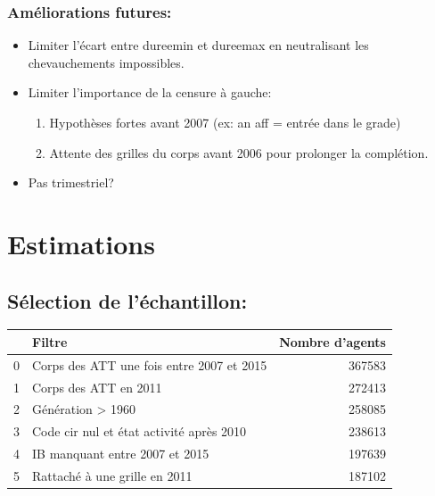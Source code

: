 \documentclass[11pt,a4paper]{article}
\begin{document}
\subsubsection*{Améliorations futures:}

\begin{itemize}[leftmargin=1cm ,parsep=0cm,itemsep=0cm,topsep=0cm] 
\item Limiter l'écart entre dureemin et dureemax en neutralisant les chevauchements impossibles. 
\item Limiter l'importance de la censure à gauche: 
\begin{enumerate}[leftmargin=1cm ,parsep=0cm,itemsep=0cm,topsep=0cm] 
\item Hypothèses fortes avant 2007 (ex: an aff = entrée dans le grade)
\item Attente des grilles du corps avant 2006 pour prolonger la complétion. 
\end{enumerate}

 \item Pas trimestriel? 
\end{itemize}


\section{Estimations}


\subsection*{Sélection de l'échantillon:}

\begin{center}
	\begin{tabular}{llr}
		\toprule
		{} &                                         Filtre &       Nombre d'agents \\
		\midrule
		0 &                                     Corps des ATT une fois entre 2007 et 2015 &  367583 \\
		1 &                     Corps des ATT en 2011 &  272413 \\
		2 &                         Génération > 1960 &  258085 \\
		3 &  Code cir nul et état activité après 2010 &  238613 \\
		4 &            IB manquant entre 2007 et 2015 &  197639 \\
		5 &             Rattaché à une grille en 2011 &  187102 \\
		\bottomrule
	\end{tabular}
\end{center}
\bigskip
\end{document}
